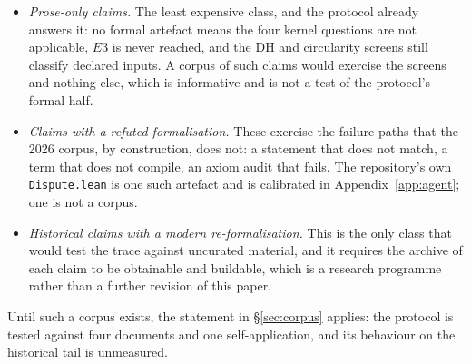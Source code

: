 \documentclass[11pt,a4paper]{article}
\newcommand{\DHf}{\mathrm{DH}}
\newcommand{\verdict}[1]{\textsf{#1}}
\begin{document}
\begin{itemize}
\item \emph{Prose-only claims.} The least expensive class, and the protocol already answers it: no
  formal artefact means the four kernel questions are \verdict{not applicable}, $E3$ is never
  reached, and the $\DHf$ and circularity screens still classify declared inputs. A corpus of such
  claims would exercise the screens and nothing else, which is informative and is not a test of the
  protocol's
  formal half.
\item \emph{Claims with a refuted formalisation.} These exercise the failure paths that the 2026
  corpus, by construction, does not: a statement that does not match, a term that does not compile,
  an axiom audit that fails. The repository's own \texttt{Dispute.lean} is one such artefact and is
  calibrated in Appendix~\ref{app:agent}; one is not a corpus.
\item \emph{Historical claims with a modern re-formalisation.} This is the only class that would
  test the trace against uncurated material, and it requires the archive of each claim to be
  obtainable and buildable, which is a research programme rather than a further revision of this paper.
\end{itemize}

Until such a corpus exists, the statement in \S\ref{sec:corpus} applies: the protocol is
tested against four documents and one self-application, and its behaviour on the historical tail is
unmeasured.
\end{document}
